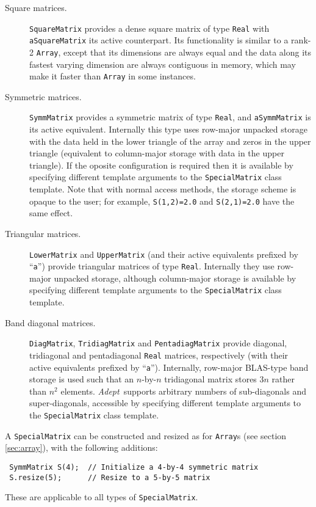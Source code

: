 \documentclass[a4,oneside]{book}
\def\codesize{\small}
\def\Adept{\emph{Adept}}
\def\code#1{{\codesize\texttt{#1}}}
\begin{document}
\begin{description}
\item[Square matrices.] \code{SquareMatrix} provides a dense square
  matrix of type \code{Real} with \code{aSquareMatrix} its active
  counterpart. Its functionality is similar to a rank-2 \code{Array},
  except that its dimensions are always equal and the data along its
  fastest varying dimension are always contiguous in memory, which may
  make it faster than \code{Array} in some instances.
\item[Symmetric matrices.] \code{SymmMatrix} provides a symmetric
  matrix of type \code{Real}, and \code{aSymmMatrix} is its active
  equivalent. Internally this type uses row-major unpacked storage
  with the data held in the lower triangle of the array and zeros in
  the upper triangle (equivalent to column-major storage with data in
  the upper triangle). If the oposite configuration is required then
  it is available by specifying different template arguments to the
  \code{SpecialMatrix} class template.  Note that with normal access
  methods, the storage scheme is opaque to the user; for example,
  \code{S(1,2)=2.0} and \code{S(2,1)=2.0} have the same effect.
\item[Triangular matrices.] \code{LowerMatrix} and \code{UpperMatrix}
  (and their active equivalents prefixed by ``\code{a}'') provide
  triangular matrices of type \code{Real}. Internally they use
  row-major unpacked storage, although column-major storage is
  available by specifying different template arguments to the
  \code{SpecialMatrix} class template.
\item[Band diagonal matrices.] \code{DiagMatrix}, \code{TridiagMatrix}
  and \code{PentadiagMatrix} provide diagonal, tridiagonal and
  pentadiagonal \code{Real} matrices, respectively (with their active
  equivalents prefixed by ``\code{a}''). Internally, row-major
  BLAS-type band storage is used such that an $n$-by-$n$ tridiagonal
  matrix stores $3n$ rather than $n^2$ elements. \Adept\ supports
  arbitrary numbers of sub-diagonals and super-diagonals, accessible
  by specifying different template arguments to the
  \code{SpecialMatrix} class template.
\end{description}
A \code{SpecialMatrix} can be constructed and resized as for
\code{Array}s (see section \ref{sec:array}), with the following
additions:
\begin{lstlisting}
 SymmMatrix S(4);  // Initialize a 4-by-4 symmetric matrix
 S.resize(5);      // Resize to a 5-by-5 matrix
\end{lstlisting}
These are applicable to all types of \code{SpecialMatrix}.
\end{document}
